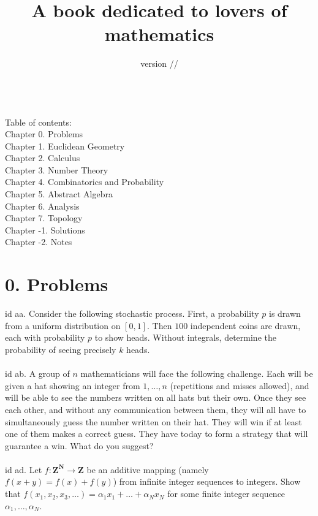 \documentclass[oneside]{book}
\title{A book dedicated to lovers of mathematics}
\author{}
\date{version \the\year/\the\month/\the\day}
\newcommand{\Z}{\mathbf{Z}}
\newcommand{\N}{\mathbf{N}}
\newcommand\chap[1]{%
  \chapter*{#1}%
  \addcontentsline{toc}{chapter}{#1}}
\begin{document}
\maketitle

\pagestyle{empty}
\tableofcontents

\phantom{}\\
Table of contents:  \\
Chapter 0. Problems   \\
Chapter 1. Euclidean Geometry  \\
Chapter 2. Calculus  \\
Chapter 3. Number Theory \\
Chapter 4. Combinatorics and Probability    \\
Chapter 5. Abstract Algebra    \\
Chapter 6. Analysis  \\
Chapter 7. Topology  \\
Chapter -1. Solutions   \\
Chapter -2. Notes   \\ 

\newpage
\chap{0. Problems}
id aa. Consider the following stochastic process. First, a probability $p$ is drawn from a uniform distribution on $[0,1]$. Then $100$ independent coins are drawn, each with probability $p$ to show heads. Without integrals, determine the probability of seeing precisely $k$ heads.    \\\\


id ab. A group of $n$ mathematicians will face the following challenge. Each will be given a hat showing an integer from $1,\dots,n$ (repetitions and misses allowed), and will be able to see the numbers written on all hats but their own. Once they see each other, and without any communication between them, they will all have to simultaneously guess the number written on their hat. They will win if at least one of them makes a correct guess. They have today to form a strategy that will guarantee a win. What do you suggest?   \\\\


id ad. Let $f:\Z^\N\to\Z$ be an additive mapping (namely $f(x+y)=f(x)+f(y)$) from infinite integer sequences to integers. Show that $f(x_1,x_2,x_3,\dots)=\alpha_1 x_1+\dots+\alpha_N x_N$ for some finite integer sequence $\alpha_1,\dots,\alpha_N$.  \\\\
\end{document}
